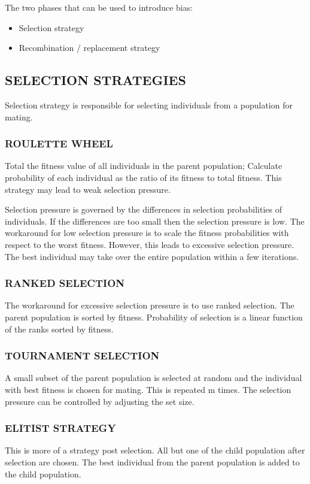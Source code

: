 \documentclass[12pt,a4paper]{article}
\begin{document}
	The two phases that can be used to introduce bias:
	\begin{itemize}
	\item Selection strategy
	\item Recombination / replacement strategy
	\end{itemize}
	
	\subsection{SELECTION STRATEGIES}
	Selection strategy is responsible for selecting individuals from a population for mating.
	\subsubsection{ROULETTE WHEEL}
	Total the fitness value of all individuals in the parent population; Calculate probability of each individual as the ratio of its fitness to total fitness. This strategy may lead to weak selection pressure. \par
	Selection pressure is governed by the differences in selection probabilities of individuals. If the differences are too small then the selection pressure is low.
	The workaround for low selection pressure is to scale the fitness probabilities with respect to the worst fitness. However, this leads to excessive selection pressure. The best individual may take over the entire population within a few iterations. \par
	
	\subsubsection{RANKED SELECTION}
	The workaround for excessive selection pressure is to use ranked selection. The parent population is sorted by fitness. Probability of selection is a linear function of the ranks sorted by fitness.
	
	\subsubsection{TOURNAMENT SELECTION}
	A small subset of the parent population is selected at random and the individual with best fitness is chosen for mating. This is repeated m times. The selection pressure can be controlled by adjusting the set size.
	
	\subsubsection{ELITIST STRATEGY}
	This is more of a strategy post selection. All but one of the child population after selection are chosen. The best individual from the parent population is added to the child population.
	
\end{document}
